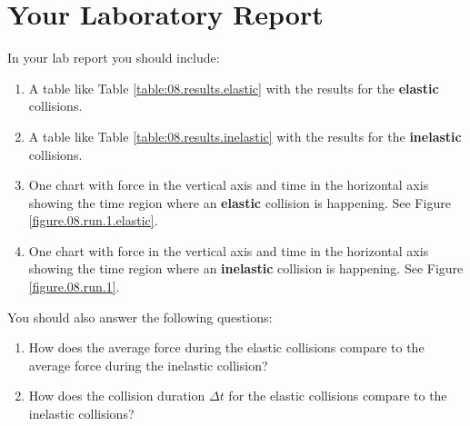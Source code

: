 \section{Your Laboratory Report}
In your lab report you should include:
\begin{enumerate}
    \item A table like Table \ref{table:08.results.elastic} with the results for the \textbf{elastic} collisions.
    \item A table like Table \ref{table:08.results.inelastic} with the results for the \textbf{inelastic} collisions.
    \item One chart with force in the vertical axis and time in the horizontal axis showing the time region where an \textbf{elastic} collision is happening. See Figure \ref{figure.08.run.1.elastic}.
    \item One chart with force in the vertical axis and time in the horizontal axis showing the time region where an \textbf{inelastic} collision is happening. See Figure \ref{figure.08.run.1}.
\end{enumerate}
You should also answer the following questions:
\begin{enumerate}
    \item How does the average force during the elastic collisions compare to the average force during the inelastic collision?
    \item How does the collision duration $\Delta t$ for the elastic collisions compare to the inelastic collisions?
\end{enumerate}
\newpage
